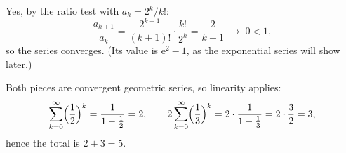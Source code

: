 \begin{solutions}
  \item Yes, by the ratio test with $a_k=2^{k}/k!$:
        \[
          \frac{a_{k+1}}{a_k}
          =\frac{2^{k+1}}{(k+1)!}\cdot\frac{k!}{2^{k}}
          =\frac{2}{k+1}
          \;\longrightarrow\;0<1 ,
        \]
        so the series converges. (Its value is $\mathrm{e}^{2}-1$, as the
        exponential series will show later.)

  \item Both pieces are convergent geometric series, so linearity applies:
        \[
          \sum_{k=0}^{\infty}\Bigl(\frac12\Bigr)^{k}
          =\frac{1}{1-\tfrac12}=2 ,
          \qquad
          2\sum_{k=0}^{\infty}\Bigl(\frac13\Bigr)^{k}
          =2\cdot\frac{1}{1-\tfrac13}=2\cdot\frac32=3 ,
        \]
        hence the total is $2+3=5$.
\end{solutions}
